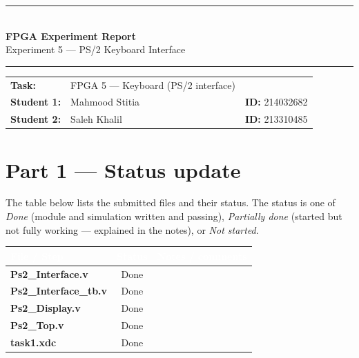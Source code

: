 \documentclass[11pt,a4paper]{article}
\begin{document}
\thispagestyle{fancy}
\begin{center}
  {\color{accent}\rule{\linewidth}{1.4pt}}\\[10pt]
  {\fontsize{24}{28}\selectfont \textbf{\color{accent}FPGA Experiment Report}}\\[6pt]
  {\large Experiment 5 --- PS/2 Keyboard Interface}\\[8pt]
  {\color{accent}\rule{\linewidth}{1.4pt}}
\end{center}

\vspace{6pt}

\renewcommand{\arraystretch}{1.3}
\begin{center}
\begin{tabular}{@{}l l l@{}}
\textbf{Task:} & FPGA 5 --- Keyboard (PS/2 interface) & \\
\textbf{Student 1:} & Mahmood Stitia & \textbf{ID:} 214032682 \\
\textbf{Student 2:} & Saleh Khalil  & \textbf{ID:} 213310485 \\
\end{tabular}
\end{center}

\vspace{6pt}

\section*{Part 1 --- Status update}

The table below lists the submitted files and their status. The status is one of
\emph{Done} (module and simulation written and passing), \emph{Partially done}
(started but not fully working --- explained in the notes), or \emph{Not started}.

\vspace{4pt}
\renewcommand{\arraystretch}{1.5}
\begin{tabularx}{\textwidth}{|>{\bfseries\ttfamily}l|c|X|}
\hline
\rowcolor{accent}
\textcolor{white}{\textbf{File / Step}} & \textcolor{white}{\textbf{Status}} & \textcolor{white}{\textbf{Notes / comments}} \\ \hline
\rowcolor{accentlt}
Ps2\_Interface.v     & Done & \\ \hline
Ps2\_Interface\_tb.v & Done & \\ \hline
\rowcolor{accentlt}
Ps2\_Display.v       & Done & \\ \hline
Ps2\_Top.v           & Done & \\ \hline
\rowcolor{accentlt}
task1.xdc            & Done & \\ \hline
\end{tabularx}
\renewcommand{\arraystretch}{1.0}
\end{document}
